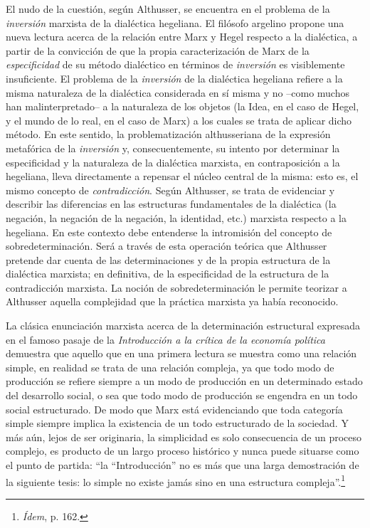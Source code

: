 El nudo de la cuestión, según Althusser, se encuentra en el problema de
la \emph{inversión} marxista de la dialéctica hegeliana. El filósofo
argelino propone una nueva lectura acerca de la relación entre Marx y
Hegel respecto a la dialéctica, a partir de la convicción de que la
propia caracterización de Marx de la \emph{especificidad} de su método
dialéctico en términos de \emph{inversión} es visiblemente insuficiente.
El problema de la \emph{inversión} de la dialéctica hegeliana refiere a
la misma naturaleza de la dialéctica considerada en sí misma y no --como
muchos han malinterpretado-- a la naturaleza de los objetos (la Idea, en
el caso de Hegel, y el mundo de lo real, en el caso de Marx) a los
cuales se trata de aplicar dicho método. En este sentido, la
problematización althusseriana de la expresión metafórica de la
\emph{inversión} y, consecuentemente, su intento por determinar la
especificidad y la naturaleza de la dialéctica marxista, en
contraposición a la hegeliana, lleva directamente a repensar el núcleo
central de la misma: esto es, el mismo concepto de \emph{contradicción}.
Según Althusser, se trata de evidenciar y describir las diferencias en
las estructuras fundamentales de la dialéctica (la negación, la negación
de la negación, la identidad, etc.) marxista respecto a la hegeliana. En
este contexto debe entenderse la intromisión del concepto de
sobredeterminación. Será a través de esta operación teórica que
Althusser pretende dar cuenta de las determinaciones y de la propia
estructura de la dialéctica marxista; en definitiva, de la especificidad
de la estructura de la contradicción marxista. La noción de
sobredeterminación le permite teorizar a Althusser aquella complejidad
que la práctica marxista ya había reconocido.

La clásica enunciación marxista acerca de la determinación estructural
expresada en el famoso pasaje de la \emph{Introducción a la crítica de
la economía política} demuestra que aquello que en una primera lectura
se muestra como una relación simple, en realidad se trata de una
relación compleja, ya que todo modo de producción se refiere siempre a
un modo de producción en un determinado estado del desarrollo social, o
sea que todo modo de producción se engendra en un todo social
estructurado. De modo que Marx está evidenciando que toda categoría
simple siempre implica la existencia de un todo estructurado de la
sociedad. Y más aún, lejos de ser originaria, la simplicidad es solo
consecuencia de un proceso complejo, es producto de un largo proceso
histórico y nunca puede situarse como el punto de partida: \enquote{la
``Introducción'' no es más que una larga demostración de la siguiente
tesis: lo simple no existe jamás sino en una estructura
compleja}.\footnote{\emph{Ídem}, p. 162.}

